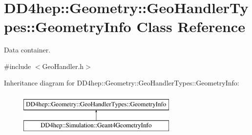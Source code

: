 \hypertarget{class_d_d4hep_1_1_geometry_1_1_geo_handler_types_1_1_geometry_info}{}\section{D\+D4hep\+:\+:Geometry\+:\+:Geo\+Handler\+Types\+:\+:Geometry\+Info Class Reference}
\label{class_d_d4hep_1_1_geometry_1_1_geo_handler_types_1_1_geometry_info}


Data container.  




{\ttfamily \#include $<$Geo\+Handler.\+h$>$}

Inheritance diagram for D\+D4hep\+:\+:Geometry\+:\+:Geo\+Handler\+Types\+:\+:Geometry\+Info\+:\begin{figure}[H]
\begin{center}
\leavevmode
\includegraphics[height=2.000000cm]{class_d_d4hep_1_1_geometry_1_1_geo_handler_types_1_1_geometry_info}
\end{center}
\end{figure}
